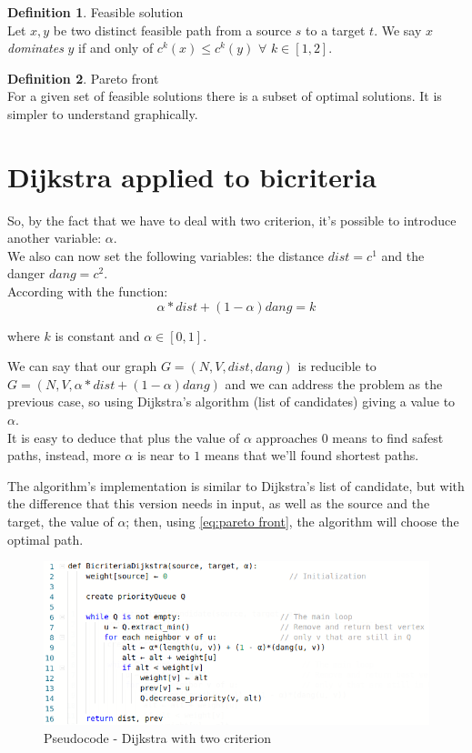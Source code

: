\documentclass[a4paper,11pt]{report}
\begin{document}
\theoremstyle{definition}
\newtheorem{definition}{Definition}
\begin{definition}{Feasible solution}\\
	Let $x, y$ be two distinct feasible path from a source $s$ to a target $t$. We say $x$ \emph{dominates} $y$ if and only of $c^k(x) \leq c^k(y)$ $\forall$ $k \in [1,2]$.
\end{definition}

\theoremstyle{definition}
\begin{definition}{Pareto front}\\
	For a given set of feasible solutions there is a subset of optimal solutions. It is simpler to understand graphically.
\end{definition}

\section{Dijkstra applied to bicriteria}
So, by the fact that we have to deal with two criterion, it's possible to introduce another variable: $\alpha$.\\
We also can now set the following variables: the distance $dist=c^1$ and the danger $dang=c^2$.\\
According with the function: 
\begin{equation}\label{eq:pareto front}
	\alpha*dist + (1-\alpha) dang = k
\end{equation}
\begin{center}
	where $k$ is constant and $\alpha \in [0, 1]$.
\end{center}
We can say that our graph $G=(N,V,dist,dang)$ is reducible to $G=(N,V,\alpha*dist + (1-\alpha) dang)$ and we can address the problem as the previous case, so using Dijkstra's algorithm (list of candidates) giving a value to $\alpha$.\\
It is easy to deduce that plus the value of $\alpha$ approaches $0$ means to find safest paths, instead, more $\alpha$ is near to $1$ means that we'll found shortest paths.

\vspace{5mm}

The algorithm's implementation is similar to Dijkstra's list of candidate, but with the difference that this version needs in input, as well as the source and the target, the value of $\alpha$; then, using \eqref{eq:pareto front}, the algorithm will choose the optimal path.

\begin{figure}[h]
	\centering
	\includegraphics[width=\linewidth]{img/bicriteriaDijkstra.png}
	\caption{Pseudocode - Dijkstra with two criterion}
	\label{fig:bicriteriaDijkstra}
\end{figure}
\
\end{document}
